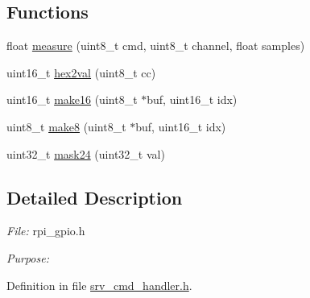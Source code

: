 \subsection*{Functions}
\begin{DoxyCompactItemize}
\item 
float \hyperlink{a00009_gac914ebaa64afce03ee852af09659cf69}{measure} (uint8\-\_\-t cmd, uint8\-\_\-t channel, float samples)
\begin{DoxyCompactList}\small\item\em 

 \end{DoxyCompactList}\item 
uint16\-\_\-t \hyperlink{a00009_gab120dc4bec6b4097a5cd3ebb91131c57}{hex2val} (uint8\-\_\-t cc)
\begin{DoxyCompactList}\small\item\em 

 \end{DoxyCompactList}\item 
uint16\-\_\-t \hyperlink{a00009_ga1e74920f34a07a82cca58eab71ed12b3}{make16} (uint8\-\_\-t $\ast$buf, uint16\-\_\-t idx)
\begin{DoxyCompactList}\small\item\em 

 \end{DoxyCompactList}\item 
uint8\-\_\-t \hyperlink{a00009_gaefa26c3e5b22ccbe5de1c33305f20e1b}{make8} (uint8\-\_\-t $\ast$buf, uint16\-\_\-t idx)
\begin{DoxyCompactList}\small\item\em 

 \end{DoxyCompactList}\item 
uint32\-\_\-t \hyperlink{a00043_a983d38050e934f77d4eb3fc73658d985}{mask24} (uint32\-\_\-t val)
\end{DoxyCompactItemize}


\subsection{Detailed Description}
{\itshape File\-:} rpi\-\_\-gpio.\-h \par
 {\itshape Purpose\-:} \par
 

Definition in file \hyperlink{a00043_source}{srv\-\_\-cmd\-\_\-handler.\-h}.



